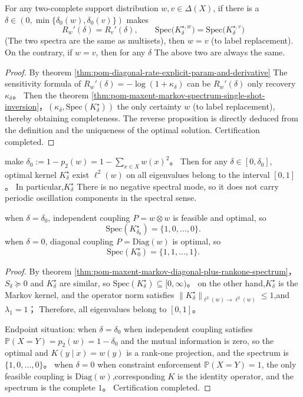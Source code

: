 \begin{corollary}\label{cor:pom-maxent-markov-spectrum-rate-complete-invariant}
For any two-complete support distribution \(w,v\in\Delta(X)\), if there is a \(\delta\in(0,\min\{\delta_0(w),\delta_0(v)\})\) makes
\[
R_w'(\delta)=R_v'(\delta),
\qquad
\mathrm{Spec}\bigl(K_{\delta}^{\star,w}\bigr)=\mathrm{Spec}\bigl(K_{\delta}^{\star,v}\bigr)
\]
(The two spectra are the same as multisets), then \(w=v\) (to label replacement).
On the contrary, if \(w=v\), then for any \(\delta\) The above two are always the same.
\end{corollary}
\begin{proof}
By theorem \ref{thm:pom-diagonal-rate-explicit-param-and-derivative} The sensitivity formula of \(R_w'(\delta)=-\log(1+\kappa_\delta)\) can be \(R_w'(\delta)\) only recovery \(\kappa_\delta\)。
Then the theorem \ref{thm:pom-maxent-markov-spectrum-single-shot-inversion}，\((\kappa_\delta,\mathrm{Spec}(K^\star_\delta))\) the only certainty \(w\) (to label replacement), thereby obtaining completeness.
The reverse proposition is directly deduced from the definition and the uniqueness of the optimal solution. Certification completed.
\end{proof}

\begin{corollary}\label{cor:pom-maxent-markov-no-oscillation-endpoints}
make \(\delta_0:=1-p_2(w)=1-\sum_{x\in X}w(x)^2\)。
Then for any \(\delta\in[0,\delta_0]\), optimal kernel \(K^\star_\delta\) exist \(\ell^2(w)\) on all eigenvalues ​​belong to the interval \([0,1]\)。
In particular,\(K^\star_\delta\) There is no negative spectral mode, so it does not carry periodic oscillation components in the spectral sense.
\par
when \(\delta=\delta_0\), independent coupling \(P=w\otimes w\) is feasible and optimal, so
\[
\mathrm{Spec}(K^\star_{\delta_0})=\{1,0,\dots,0\}.
\]
when \(\delta=0\), diagonal coupling \(P=\mathrm{Diag}(w)\) is optimal, so
\[
\mathrm{Spec}(K^\star_0)=\{1,1,\dots,1\}.
\]
\end{corollary}
\begin{proof}
By theorem \ref{thm:pom-maxent-markov-diagonal-plus-rankone-spectrum}，\(S_\delta\succeq0\) and \(K^\star_\delta\) are similar, so \(\mathrm{Spec}(K^\star_\delta)\subseteq[0,\infty)\)。
on the other hand,\(K^\star_\delta\) is the Markov kernel, and the operator norm satisfies \(\|K^\star_\delta\|_{\ell^2(w)\to \ell^2(w)}\le 1\),and \(\lambda_1=1\)；
Therefore, all eigenvalues ​​belong to \([0,1]\)。
\par
Endpoint situation: when \(\delta=\delta_0\) when independent coupling satisfies \(\mathbb P(X=Y)=p_2(w)=1-\delta_0\) and the mutual information is zero, so the optimal and
\(
K(y\mid x)=w(y)
\) is a rank-one projection, and the spectrum is \(\{1,0,\dots,0\}\)。
when \(\delta=0\) when constraint enforcement \(\mathbb P(X=Y)=1\), the only feasible coupling is \(\mathrm{Diag}(w)\),corresponding \(K\) is the identity operator, and the spectrum is the complete \(1\)。
Certification completed.
\end{proof}

